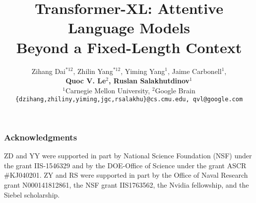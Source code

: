 \documentclass[11pt,a4paper]{article}
\title{Transformer-XL: Attentive Language Models \\ Beyond a Fixed-Length Context}
\author{Zihang Dai$^{*12}$, Zhilin Yang$^{*12}$, Yiming Yang$^1$, Jaime Carbonell$^1$, \\
	{\bf Quoc V. Le$^2$, Ruslan Salakhutdinov$^1$ }\\
	$^1$Carnegie Mellon University, $^2$Google Brain \\
	{\small \texttt{\{dzihang,zhiliny,yiming,jgc,rsalakhu\}@cs.cmu.edu, qvl@google.com} } 
}
\date{}
\begin{document}
\maketitle

\renewcommand{\thefootnote}{\fnsymbol{footnote}}
\renewcommand{\thefootnote}{\arabic{footnote}}








\subsubsection*{Acknowledgments}
ZD and YY were supported in part by National Science Foundation (NSF) under the grant IIS-1546329 and by the DOE-Office of Science under the grant ASCR \#KJ040201.
ZY and RS were supported in part by the Office of Naval Research grant N000141812861, the NSF grant IIS1763562, the Nvidia fellowship, and the Siebel scholarship.



\FloatBarrier




\FloatBarrier

\appendix

\end{document}
